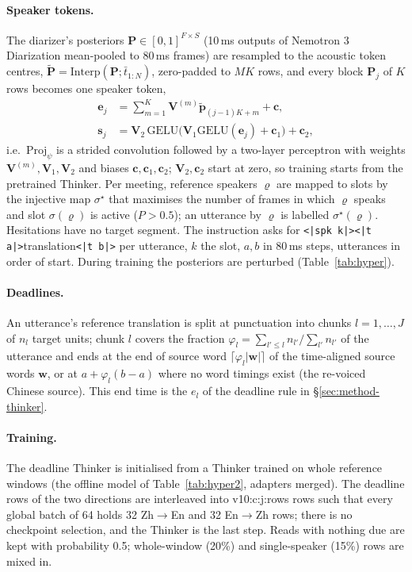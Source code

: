 \paragraph{Speaker tokens.} The diarizer's posteriors $\bm{P}\in[0,1]^{F\times S}$ (10\,ms outputs of Nemotron 3
Diarization mean-pooled to 80\,ms frames) are resampled to the acoustic token centres,
$\tilde{\bm{P}}=\mathrm{Interp}(\bm{P};\bar{t}_{1:N})$, zero-padded to $MK$ rows, and every block $\bm{P}_j$ of $K$ rows
becomes one speaker token,
\begin{equation}
\begin{aligned}
\bm{e}_j&=\textstyle\sum_{m=1}^{K}\bm{V}^{(m)}\tilde{\bm{p}}_{(j-1)K+m}+\bm{c},\\
\bm{s}_j&=\bm{V}_2\,\mathrm{GELU}\big(\bm{V}_1\mathrm{GELU}(\bm{e}_j)+\bm{c}_1\big)+\bm{c}_2,
\end{aligned}
\label{eq:conv}
\end{equation}
i.e.\ $\mathrm{Proj}_\psi$ is a strided convolution followed by a two-layer perceptron with weights $\bm{V}^{(m)},\bm{V}_1,\bm{V}_2$ and biases $\bm{c},\bm{c}_1,\bm{c}_2$; $\bm{V}_2,\bm{c}_2$ start at zero, so training starts from
the pretrained Thinker. Per meeting, reference speakers $\varrho$ are mapped to slots by the injective map $\sigma^\star$
that maximises the number of frames in which $\varrho$ speaks and slot $\sigma(\varrho)$ is active ($P>0.5$); an
utterance by $\varrho$ is labelled $\sigma^\star(\varrho)$. Hesitations have no target segment. The instruction asks for
\texttt{<|spk k|><|t a|>}translation\texttt{<|t b|>} per utterance, $k$ the slot, $a,b$ in 80\,ms steps, utterances in
order of start. During training the posteriors are perturbed (Table~\ref{tab:hyper}).

\paragraph{Deadlines.} An utterance's reference translation is split at punctuation into chunks $l=1,\dots,J$ of
$n_l$ target units; chunk $l$ covers the fraction $\varphi_l=\sum_{l'\le l}n_{l'}/\sum_{l'}n_{l'}$ of the utterance and
ends at the end of source word $\lceil\varphi_l|\bm{w}|\rceil$ of the time-aligned source words $\bm{w}$, or at
$a+\varphi_l(b-a)$ where no word timings exist (the re-voiced Chinese source). This end time is the $e_l$ of the
deadline rule in \S\ref{sec:method-thinker}.

\paragraph{Training.} The deadline Thinker is initialised from a Thinker trained on whole reference windows (the
offline model of Table~\ref{tab:hyper2}, adapters merged). The deadline rows of the two directions are interleaved into
\num{v10:c:j:rows} rows such that every global batch of 64 holds 32 Zh$\rightarrow$En and 32 En$\rightarrow$Zh rows;
there is no checkpoint selection, and the Thinker is the last step. Reads with nothing due are kept with probability
0.5; whole-window (20\%) and single-speaker (15\%) rows are mixed in.

